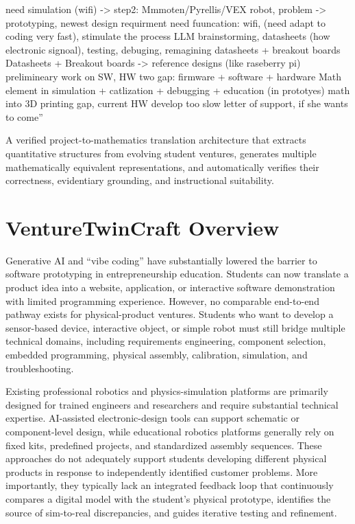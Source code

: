 need simulation (wifi) -> step2: Mmmoten/Pyrellis/VEX robot, problem -> prototyping, newest design requirment need fuuncation: wifi, (need adapt to coding very fast), stimulate the process LLM brainstorming, datasheets (how electronic signoal), testing, debuging, remagining datasheets + breakout boards Datasheets + Breakout boards -> reference designs (like raseberry pi) prelimineary work on SW, HW two gap: firmware + software + hardware Math element in simulation + catlization + debugging + education (in prototyes) math into 3D printing gap, current HW develop too slow letter of support, if she wants to come”


A verified project-to-mathematics translation architecture that extracts quantitative structures from evolving student ventures, generates multiple mathematically equivalent representations, and automatically verifies their correctness, evidentiary grounding, and instructional suitability.

\section{VentureTwinCraft Overview}

Generative AI and “vibe coding” have substantially lowered the barrier to software prototyping in entrepreneurship education. Students can now translate a product idea into a website, application, or interactive software demonstration with limited programming experience. However, no comparable end-to-end pathway exists for physical-product ventures. Students who want to develop a sensor-based device, interactive object, or simple robot must still bridge multiple technical domains, including requirements engineering, component selection, embedded programming, physical assembly, calibration, simulation, and troubleshooting.

Existing professional robotics and physics-simulation platforms are primarily designed for trained engineers and researchers and require substantial technical expertise. AI-assisted electronic-design tools can support schematic or component-level design, while educational robotics platforms generally rely on fixed kits, predefined projects, and standardized assembly sequences. These approaches do not adequately support students developing different physical products in response to independently identified customer problems. More importantly, they typically lack an integrated feedback loop that continuously compares a digital model with the student’s physical prototype, identifies the source of sim-to-real discrepancies, and guides iterative testing and refinement.

